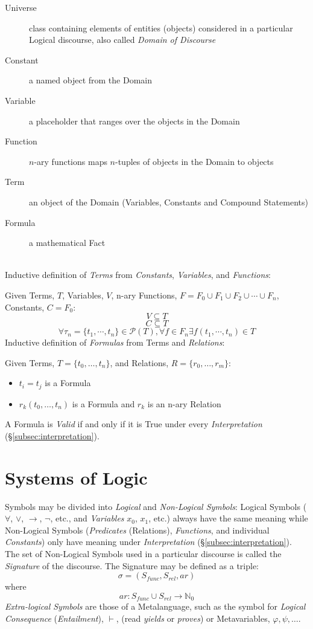 \documentclass{article}
\begin{document}
\begin{description}
\item[Universe] class containing elements of entities (objects)
  considered in a particular Logical discourse, also called
  \emph{Domain of Discourse}
\item[Constant] a named object from the Domain
\item[Variable] a placeholder that ranges over the objects in the
  Domain
\item[Function] $n$-ary functions maps $n$-tuples of objects in the
  Domain to objects
\item[Term] an object of the Domain (Variables, Constants and Compound
  Statements)
\item[Formula] a mathematical Fact
\end{description}
\hfill \\ Inductive definition of \emph{Terms} from \emph{Constants},
\emph{Variables}, and \emph{Functions}:

Given Terms, $T$, Variables, $V$, n-ary Functions, $F = F_0 \cup F_1
\cup F_2 \cup \cdots \cup F_n$, Constants, $C = F_0$:
\[
    V \subseteq T
\]\[
    C \subseteq T
\]\[
    \forall \tau_n=\{t_1,\cdots,t_n\} \in \mathcal{P}(T), \forall f \in F_n
    \exists f(t_1,\cdots,t_n) \in T
\]
Inductive definition of \emph{Formulas} from Terms and
\emph{Relations}:

Given Terms, $T = \{t_0,\ldots,t_n\}$, and Relations, $R = \{r_0,\ldots,r_m\}$:
\begin{itemize}
\item $t_i = t_j$ is a Formula
\item $r_k(t_0,\ldots,t_n)$ is a Formula and $r_k$ is an n-ary Relation
\end{itemize}
A Formula is \emph{Valid} if and only if it is True under every
\emph{Interpretation} (\S\ref{subsec:interpretation}).

\section{Systems of Logic} \label{sec:formal_systems}

Symbols may be divided into \emph{Logical} and \emph{Non-Logical
  Symbols}: Logical Symbols ($\forall$, $\vee$, $\rightarrow$, $\neg$,
etc., and \emph{Variables} $x_0$, $x_1$, etc.) always have the same
meaning while Non-Logical Symbols (\emph{Predicates} (Relations),
\emph{Functions}, and individual \emph{Constants}) only have meaning
under \emph{Interpretation} (\S\ref{subsec:interpretation}). The set of
Non-Logical Symbols used in a particular discourse is called the
\emph{Signature} of the discourse. The Signature may be defined as a
triple:
\[
    \sigma = (S_{func},S_{rel},ar)
\]
where
\[
    ar: S_{func} \cup S_{rel} \rightarrow \mathbb{N}_0
\]
\emph{Extra-logical Symbols} are those of a Metalanguage, such as the
symbol for \emph{Logical Consequence} (\emph{Entailment}), $\vdash$,
(read \emph{yields} or \emph{proves}) or Metavariables, $\varphi,
\psi, \ldots$.
\end{document}
